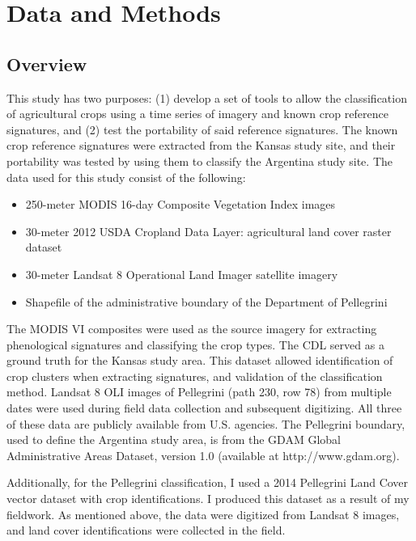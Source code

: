 \chapter{Data and Methods}
\label{methods}

\section{Overview}

This study has two purposes: (1) develop a set of tools to allow the classification of agricultural crops using a time series of imagery and known crop reference signatures, and (2) test the portability of said reference signatures. The known crop reference signatures were extracted from the Kansas study site, and their portability was tested by using them to classify the Argentina study site. The data used for this study consist of the following:

\begin{Spacing}{1.2}
\begin{itemize}
  \item 250-meter MODIS 16-day Composite Vegetation Index images
  \item 30-meter 2012 USDA Cropland Data Layer: agricultural land cover raster dataset
  \item 30-meter Landsat 8 Operational Land Imager satellite imagery
  \item Shapefile of the administrative boundary of the Department of Pellegrini
\end{itemize}
\end{Spacing}

The MODIS VI composites were used as the source imagery for extracting phenological signatures and classifying the crop types. The CDL served as a ground truth for the Kansas study area. This dataset allowed identification of crop clusters when extracting signatures, and validation of the classification method. Landsat 8 OLI images of Pellegrini (path 230, row 78) from multiple dates were used during field data collection and subsequent digitizing. All three of these data are publicly available from U.S. agencies. The Pellegrini boundary, used to define the Argentina study area, is from the GDAM Global Administrative Areas Dataset, version 1.0 (available at http://www.gdam.org).

Additionally, for the Pellegrini classification, I used a 2014 Pellegrini Land Cover vector dataset with crop identifications. I produced this dataset as a result of my fieldwork. As mentioned above, the data were digitized from Landsat 8 images, and land cover identifications were collected in the field.

